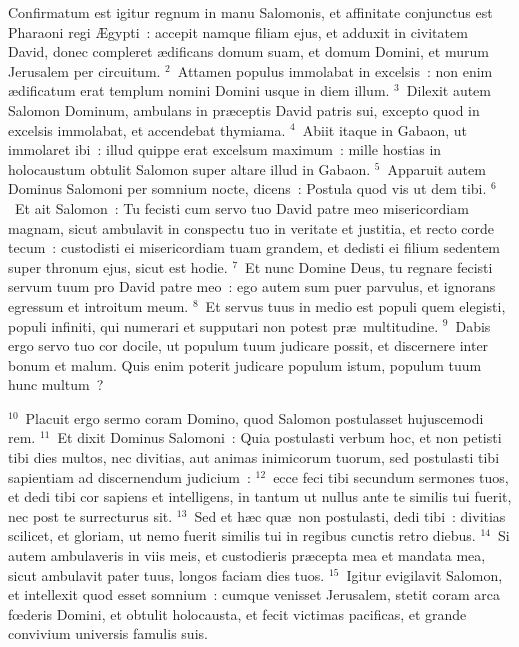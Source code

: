 \bchapter
\lettrine[lines=3,image=true,loversize=0.05,lraise=-0.03]{C}{}onfirmatum est igitur regnum in manu Salomonis, et affinitate conjunctus est Pharaoni regi \AE gypti~: accepit namque filiam ejus, et adduxit in civitatem David, donec compleret \ae dificans domum suam, et domum Domini, et murum Jerusalem per circuitum.
${}^{2}$~Attamen populus immolabat in excelsis~: non enim \ae dificatum erat templum nomini Domini usque in diem illum.
${}^{3}$~Dilexit autem Salomon Dominum, ambulans in pr\ae ceptis David patris sui, excepto quod in excelsis immolabat, et accendebat thymiama.
${}^{4}$~Abiit itaque in Gabaon, ut immolaret ibi~: illud quippe erat excelsum maximum~: mille hostias in holocaustum obtulit Salomon super altare illud in Gabaon.
${}^{5}$~Apparuit autem Dominus Salomoni per somnium nocte, dicens~: Postula quod vis ut dem tibi.
${}^{6}$~Et ait Salomon~: Tu fecisti cum servo tuo David patre meo misericordiam magnam, sicut ambulavit in conspectu tuo in veritate et justitia, et recto corde tecum~: custodisti ei misericordiam tuam grandem, et dedisti ei filium sedentem super thronum ejus, sicut est hodie.
${}^{7}$~Et nunc Domine Deus, tu regnare fecisti servum tuum pro David patre meo~: ego autem sum puer parvulus, et ignorans egressum et introitum meum.
${}^{8}$~Et servus tuus in medio est populi quem elegisti, populi infiniti, qui numerari et supputari non potest pr\ae\ multitudine.
${}^{9}$~Dabis ergo servo tuo cor docile, ut populum tuum judicare possit, et discernere inter bonum et malum. Quis enim poterit judicare populum istum, populum tuum hunc multum~?


${}^{10}$~Placuit ergo sermo coram Domino, quod Salomon postulasset hujuscemodi rem.
${}^{11}$~Et dixit Dominus Salomoni~: Quia postulasti verbum hoc, et non petisti tibi dies multos, nec divitias, aut animas inimicorum tuorum, sed postulasti tibi sapientiam ad discernendum judicium~:
${}^{12}$~ecce feci tibi secundum sermones tuos, et dedi tibi cor sapiens et intelligens, in tantum ut nullus ante te similis tui fuerit, nec post te surrecturus sit.
${}^{13}$~Sed et h\ae c qu\ae\ non postulasti, dedi tibi~: divitias scilicet, et gloriam, ut nemo fuerit similis tui in regibus cunctis retro diebus.
${}^{14}$~Si autem ambulaveris in viis meis, et custodieris pr\ae cepta mea et mandata mea, sicut ambulavit pater tuus, longos faciam dies tuos.
${}^{15}$~Igitur evigilavit Salomon, et intellexit quod esset somnium~: cumque venisset Jerusalem, stetit coram arca fœderis Domini, et obtulit holocausta, et fecit victimas pacificas, et grande convivium universis famulis suis.



